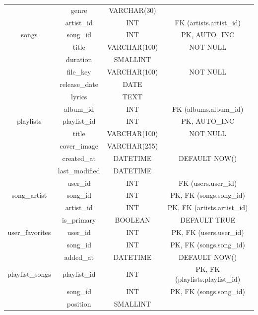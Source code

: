 \documentclass{base}
\numberwithin{figure}{section} %
\begin{document}
\begin{longtable}{@{}cccc@{}}
                & genre              & VARCHAR(30)  &                                 \\
                & artist\_id         & INT          & FK (artists.artist\_id)         \\
songs           & song\_id           & INT          & PK, AUTO\_INC                   \\
                & title              & VARCHAR(100) & NOT NULL                        \\
                & duration           & SMALLINT     &                                 \\
                & file\_key          & VARCHAR(100) & NOT NULL                        \\
                & release\_date      & DATE         &                                 \\
                & lyrics             & TEXT         &                                 \\
                & album\_id          & INT          & FK (albums.album\_id)           \\
playlists       & playlist\_id       & INT          & PK, AUTO\_INC                   \\
                & title              & VARCHAR(100) & NOT NULL                        \\
                & cover\_image       & VARCHAR(255) &                                 \\
                & created\_at        & DATETIME     & DEFAULT NOW()                   \\
                & last\_modified     & DATETIME     &                                 \\
                & user\_id           & INT          & FK (users.user\_id)             \\
song\_artist    & song\_id           & INT          & PK, FK (songs.song\_id)         \\
                & artist\_id         & INT          & PK, FK (artists.artist\_id)     \\
                & is\_primary        & BOOLEAN      & DEFAULT TRUE                    \\
user\_favorites & user\_id           & INT          & PK, FK (users.user\_id)         \\
                & song\_id           & INT          & PK, FK (songs.song\_id)         \\
                & added\_at          & DATETIME     & DEFAULT NOW()                   \\
playlist\_songs & playlist\_id       & INT          & PK, FK (playlists.playlist\_id) \\
                & song\_id           & INT          & PK, FK (songs.song\_id)         \\
                & position           & SMALLINT     &                                 \\* \bottomrule
\end{longtable}
\end{document}
